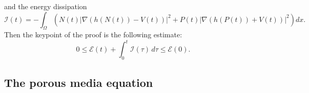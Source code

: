 \documentclass[smallextended]{svjour3}
\begin{document}
and the energy dissipation
\begin{equation}
\mathcal{I}(t)=-\int_{\Omega}\left(N(t)\left\vert \nabla(h(N(t))-V(t))\right\vert^{2}+P(t)\left\vert \nabla(h(P(t))+V(t))\right\vert^{2}\right)dx.
\label{Icontinusc}
\end{equation}
Then the keypoint of the proof is the following estimate:
\begin{equation}
0 \leq \mathcal{E}(t)+\int_{0}^{t}\mathcal{I}(\tau)\,d\tau \leq \mathcal{E}(0).
\label{inegentropie}
\end{equation}



\subsection{The porous media equation}
\end{document}
